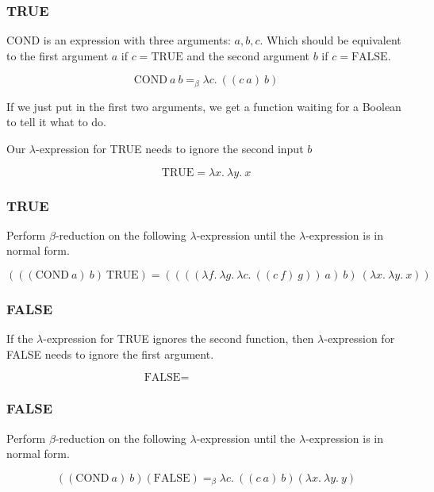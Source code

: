 \documentclass{beamer}
\begin{document}
\begin{frame}
	\frametitle{TRUE}

	COND is an expression with three arguments: $a,b,c$. Which should be equivalent to the first argument $a$ if $c = \text{TRUE}$ and the second argument $b$ if $c = \text{FALSE}$.

	$$\text{COND} \ a \ b =_{\beta} \lambda c. \ ((c \ a) \ b) $$

	If we just put in the first two arguments, we get a function waiting for a Boolean to tell it what to do. 

	\vspace{0.5cm}

	Our $\lambda$-expression for TRUE needs to ignore the second input $b$ 

	$$\text{TRUE} = \lambda x. \ \lambda y. \ x$$


	
\end{frame}

\begin{frame}
	\frametitle{TRUE}

	Perform $\beta$-reduction on the following $\lambda$-expression until the $\lambda$-expression is in normal form. 

	$$ (((\text{COND} \ a) \ b) \ \text{TRUE}) = ((((\lambda f. \ \lambda g. \ \lambda c. \ ((c \ f) \ g) ) \ a) \ b) \ (\lambda x. \ \lambda y. \ x))$$

	\vspace{5cm}

\end{frame}


\begin{frame}
	\frametitle{FALSE}
	
	If the $\lambda$-expression for TRUE ignores the second function, then $\lambda$-expression for FALSE needs to ignore the first argument.

	$$ \text{FALSE} =\hspace{3cm} $$

	\vspace{5cm}
	
\end{frame}

\begin{frame}
	\frametitle{FALSE}

	Perform $\beta$-reduction on the following $\lambda$-expression until the $\lambda$-expression is in normal form. 

	$$ ((\text{COND} \ a) \ b)(\text{FALSE}) =_{\beta} \lambda c. \ ((c \ a) \ b)(\lambda x. \ \lambda y. \ y)$$

	\vspace{5cm}

\end{frame}
\end{document}
